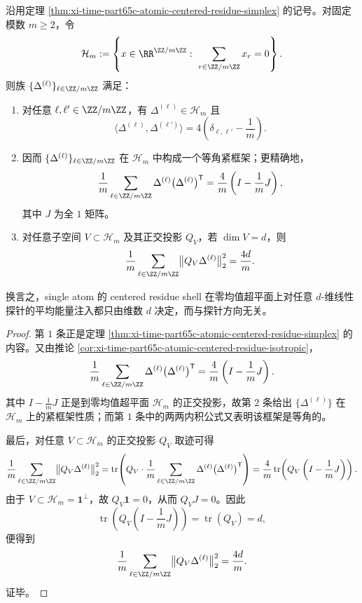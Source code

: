 \begin{theorem}\label{thm:xi-time-part77-atomic-centered-residue-tight-frame}
沿用定理 \ref{thm:xi-time-part65c-atomic-centered-residue-simplex} 的记号。对固定模数 \(m\ge 2\)，令
\[
\mathcal H_m
:=
\left\{x\in\RR^{\ZZ/m\ZZ}:\ \sum_{r\in\ZZ/m\ZZ}x_r=0\right\}.
\]
则族 \(\{\Delta^{(\ell)}\}_{\ell\in\ZZ/m\ZZ}\) 满足：
\begin{enumerate}
  \item 对任意 \(\ell,\ell'\in\ZZ/m\ZZ\)，有 \(\Delta^{(\ell)}\in\mathcal H_m\) 且
  \[
  \bigl\langle \Delta^{(\ell)},\Delta^{(\ell')}\bigr\rangle
  =
  4\left(\delta_{\ell,\ell'}-\frac{1}{m}\right).
  \]
  \item 因而 \(\{\Delta^{(\ell)}\}_{\ell\in\ZZ/m\ZZ}\) 在 \(\mathcal H_m\) 中构成一个等角紧框架；更精确地，
  \[
  \frac{1}{m}\sum_{\ell\in\ZZ/m\ZZ}
  \Delta^{(\ell)}\bigl(\Delta^{(\ell)}\bigr)^{\mathsf T}
  =
  \frac{4}{m}\left(I-\frac{1}{m}J\right),
  \]
  其中 \(J\) 为全 \(1\) 矩阵。
  \item 对任意子空间 \(V\subset\mathcal H_m\) 及其正交投影 \(Q_V\)，若 \(\dim V=d\)，则
  \[
  \frac{1}{m}\sum_{\ell\in\ZZ/m\ZZ}
  \bigl\|Q_V\Delta^{(\ell)}\bigr\|_2^2
  =
  \frac{4d}{m}.
  \]
\end{enumerate}
换言之，single atom 的 centered residue shell 在零均值超平面上对任意 \(d\)-维线性探针的平均能量注入都只由维数 \(d\) 决定，而与探针方向无关。
\end{theorem}
\begin{proof}
第 \(1\) 条正是定理 \ref{thm:xi-time-part65c-atomic-centered-residue-simplex} 的内容。又由推论 \ref{cor:xi-time-part65c-atomic-centered-residue-isotropic}，
\[
\frac{1}{m}\sum_{\ell\in\ZZ/m\ZZ}
\Delta^{(\ell)}\bigl(\Delta^{(\ell)}\bigr)^{\mathsf T}
=
\frac{4}{m}\left(I-\frac{1}{m}J\right).
\]
其中 \(I-\frac{1}{m}J\) 正是到零均值超平面 \(\mathcal H_m\) 的正交投影，故第 \(2\) 条给出 \(\{\Delta^{(\ell)}\}\) 在 \(\mathcal H_m\) 上的紧框架性质；而第 \(1\) 条中的两两内积公式又表明该框架是等角的。

最后，对任意 \(V\subset\mathcal H_m\) 的正交投影 \(Q_V\) 取迹可得
\[
\frac{1}{m}\sum_{\ell\in\ZZ/m\ZZ}
\bigl\|Q_V\Delta^{(\ell)}\bigr\|_2^2
=
\operatorname{tr}\!\left(
Q_V\cdot
\frac{1}{m}\sum_{\ell\in\ZZ/m\ZZ}
\Delta^{(\ell)}\bigl(\Delta^{(\ell)}\bigr)^{\mathsf T}
\right)
=
\frac{4}{m}\operatorname{tr}\!\left(Q_V\left(I-\frac{1}{m}J\right)\right).
\]
由于 \(V\subset\mathcal H_m=\mathbf 1^\perp\)，故 \(Q_V\mathbf 1=0\)，从而 \(Q_VJ=0\)。因此
\[
\operatorname{tr}\!\left(Q_V\left(I-\frac{1}{m}J\right)\right)
=
\operatorname{tr}(Q_V)
=
d,
\]
便得到
\[
\frac{1}{m}\sum_{\ell\in\ZZ/m\ZZ}
\bigl\|Q_V\Delta^{(\ell)}\bigr\|_2^2
=
\frac{4d}{m}.
\]
证毕。
\end{proof}


